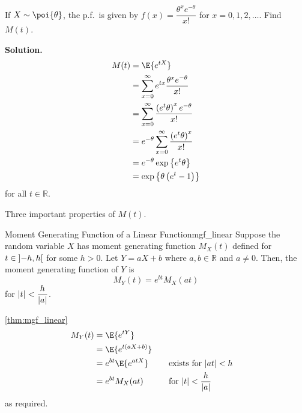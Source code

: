 \begin{Example}{}{}
    If $ X \sim \poi{\theta} $, the p.f.\ is given by
    $ f(x)=\dfrac{\theta^x e^{-\theta}}{x!} $
    for $ x=0,1,2,\ldots $. Find $ M(t) $.

    \textbf{Solution.}
    \begin{align*}
        M(t)
         & =\E{e^{tX}}                                                                    \\
         & =\sum\limits_{x=0}^{\infty} e^{tx} \frac{\theta^x e^{-\theta}}{x!}             \\
         & =\sum\limits_{x=0}^{\infty} \frac{\left( e^t \theta \right)^x e^{-\theta}}{x!} \\
         & =e^{-\theta}\sum\limits_{x=0}^{\infty} \frac{\left( e^t \theta \right)^x}{x!}  \\
         & =e^{-\theta} \exp\left\{e^t \theta\right\}                                     \\
         & =\exp\left\{\theta\left( e^t-1 \right)\right\}
    \end{align*}
    for all $ t\in\mathbb{R} $.
\end{Example}
Three important properties of $ M(t) $.

\begin{Theorem}{Moment Generating Function of a Linear Function}{mgf_linear}
    Suppose the random variable $ X $ has moment generating function
    $ M_X(t) $ defined for $ t\in\interval[open]{-h}{h} $ for some $ h>0 $.
    Let $ Y=aX+b $ where $ a,b\in\mathbb{R} $ and $ a\neq 0 $. Then,
    the moment generating function of $ Y $ is
    \[ M_Y(t)=e^{bt}M_X(at) \]
    for $ \lvert t\rvert<\dfrac{h}{\lvert a\rvert} $.
\end{Theorem}

\begin{Proof}{\ref{thm:mgf_linear}}{}
    \begin{align*}
        M_Y(t)
         & =\E{e^{tY}}                                                       \\
         & =\E{e^{t(aX+b)}}                                                  \\
         & =e^{bt}\E{e^{atX}} & \quad & \text{exists for }\abs{at}<h         \\
         & =e^{bt}M_X(at)     &       & \text{for }\abs{t}<\frac{h}{\abs{a}}
    \end{align*}
    as required.
\end{Proof}

